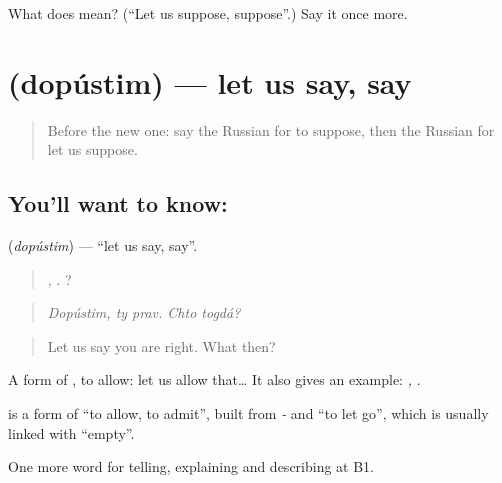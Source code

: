 \begin{tcolorbox}[breakable,colback=teal!4,colframe=teal!35!black,title={Before you move on}]
What does  mean? (\textquotedblleft{}Let us suppose, suppose\textquotedblright{}.) Say it once more.
\end{tcolorbox}
\section[\texorpdfstring{\ru{допустим} (dopústim)}{допустим (dopústim)}]{ (dopústim) — let us say, say}

\label{lesson:RU-C371-dopustim}



\begin{quote}
Before the new one: say the Russian for to suppose, then the Russian for let us suppose.
\end{quote}

\subsection*{You'll want to know: }
\textbf{} (\emph{dopústim}) — \textquotedblleft{}let us say, say\textquotedblright{}.

\begin{quote}
,  .  ?
\end{quote}

\begin{quote}
\emph{Dopústim, ty prav. Chto togdá?}
\end{quote}

\begin{quote}
Let us say you are right. What then?
\end{quote}

A form of \emph{}, to allow: let us allow that… It also gives an example: \emph{,  }.

\begin{cousinweb}
\textbf{} is a form of \emph{} \textquotedblleft{}to allow, to admit\textquotedblright{}, built from \emph{-} and \emph{} \textquotedblleft{}to let go\textquotedblright{}, which is usually linked with \emph{} \textquotedblleft{}empty\textquotedblright{}.
\end{cousinweb}

\begin{grammarlens}[title={What you've built}]
One more word for telling, explaining and describing at B1.
\end{grammarlens}

